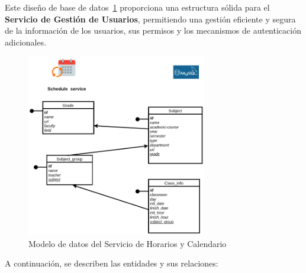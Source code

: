 Este diseño de base de datos~\ref{fig:schedule_service_er} proporciona una estructura sólida para el \textbf{Servicio de Gestión de Usuarios}, permitiendo una gestión eficiente y segura de la información de los usuarios, sus permisos y los mecanismos de autenticación adicionales.

\begin{figure}[H]
    \centering
    \includegraphics[width=0.7\textwidth]{figures/06_calendar_db.png}
    \caption{Modelo de datos del Servicio de Horarios y Calendario}
    \label{fig:schedule_service_er}
\end{figure}

A continuación, se describen las entidades y sus relaciones:

